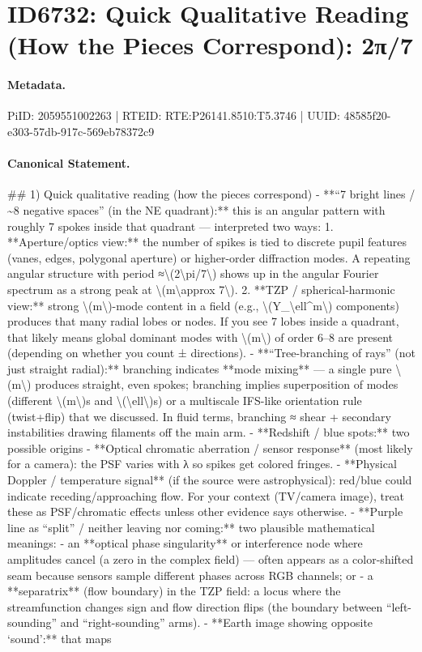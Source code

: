 \section*{ID6732: Quick Qualitative Reading (How the Pieces Correspond): 2π/7}
\paragraph{Metadata.}
PiID: 2059551002263 | RTEID: RTE:P26141.8510:T5.3746 | UUID: 48585f20-e303-57db-917c-569eb78372c9

\paragraph{Canonical Statement.}
\#\# 1) Quick qualitative reading (how the pieces correspond) - **“7 bright lines / \textasciitilde{}8 negative spaces” (in the NE quadrant):** this is an angular pattern with roughly 7 spokes inside that quadrant — interpreted two ways: 1. **Aperture/optics view:** the number of spikes is tied to discrete pupil features (vanes, edges, polygonal aperture) or higher-order diffraction modes. A repeating angular structure with period ≈\textbackslash{}(2\textbackslash{}pi/7\textbackslash{}) shows up in the angular Fourier spectrum as a strong peak at \textbackslash{}(m\textbackslash{}approx 7\textbackslash{}). 2. **TZP / spherical-harmonic view:** strong \textbackslash{}(m\textbackslash{})-mode content in a field (e.g., \textbackslash{}(Y\_\textbackslash{}ell\textasciicircum{}m\textbackslash{}) components) produces that many radial lobes or nodes. If you see 7 lobes inside a quadrant, that likely means global dominant modes with \textbackslash{}(m\textbackslash{}) of order 6–8 are present (depending on whether you count ± directions). - **“Tree-branching of rays” (not just straight radial):** branching indicates **mode mixing** — a single pure \textbackslash{}(m\textbackslash{}) produces straight, even spokes; branching implies superposition of modes (different \textbackslash{}(m\textbackslash{})s and \textbackslash{}(\textbackslash{}ell\textbackslash{})s) or a multiscale IFS-like orientation rule (twist+flip) that we discussed. In fluid terms, branching ≈ shear + secondary instabilities drawing filaments off the main arm. - **Redshift / blue spots:** two possible origins - **Optical chromatic aberration / sensor response** (most likely for a camera): the PSF varies with λ so spikes get colored fringes. - **Physical Doppler / temperature signal** (if the source were astrophysical): red/blue could indicate receding/approaching flow. For your context (TV/camera image), treat these as PSF/chromatic effects unless other evidence says otherwise. - **Purple line as “split” / neither leaving nor coming:** two plausible mathematical meanings: - an **optical phase singularity** or interference node where amplitudes cancel (a zero in the complex field) — often appears as a color-shifted seam because sensors sample different phases across RGB channels; or - a **separatrix** (flow boundary) in the TZP field: a locus where the streamfunction changes sign and flow direction flips (the boundary between “left-sounding” and “right-sounding” arms). - **Earth image showing opposite ‘sound’:** that maps 